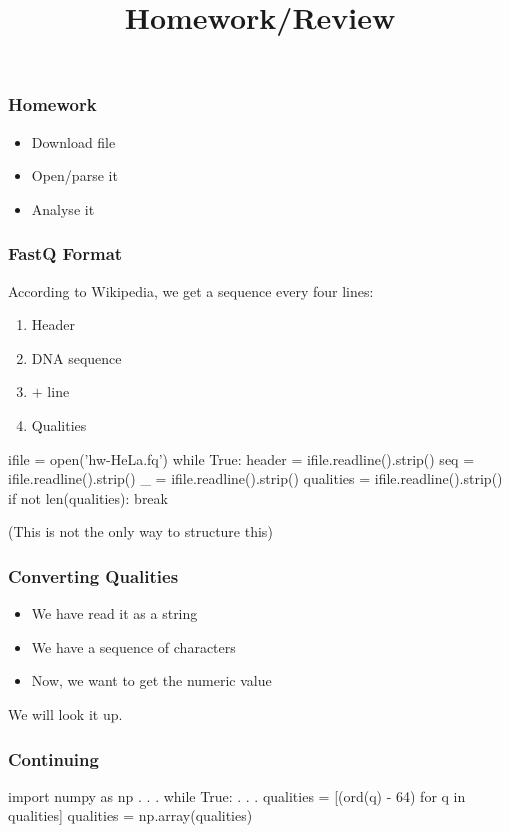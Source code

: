
\title{Homework/Review}
\usepackage{pgfpages}


\frame{\maketitle}

\begin{frame}[fragile]
\frametitle{Homework}
\begin{itemize}
\item Download file
\item Open/parse it
\item Analyse it
\end{itemize}
\end{frame}

\begin{frame}[fragile]
\frametitle{FastQ Format}
According to Wikipedia, we get a sequence every four lines:

\begin{enumerate}
\item Header
\item DNA sequence
\item $+$ line
\item Qualities
\end{enumerate}

\begin{python}
ifile = open('hw-HeLa.fq')
while True:
    header = ifile.readline().strip()
    seq = ifile.readline().strip()
    _ = ifile.readline().strip()
    qualities = ifile.readline().strip()
    if not len(qualities):
        break
\end{python}

(This is not the only way to structure this)
\end{frame}

\begin{frame}[fragile]
\frametitle{Converting Qualities}
\begin{itemize}
\item We have read it as a string
\item We have a sequence of characters
\item Now, we want to get the numeric value
\end{itemize}

We will look it up.
\end{frame}

\begin{frame}[fragile]
\frametitle{Continuing}

\begin{python}
import numpy as np
. . .
while True:
    . . .
    qualities = [(ord(q) - 64) for q in qualities]
    qualities = np.array(qualities)
\end{python}

\end{frame}


